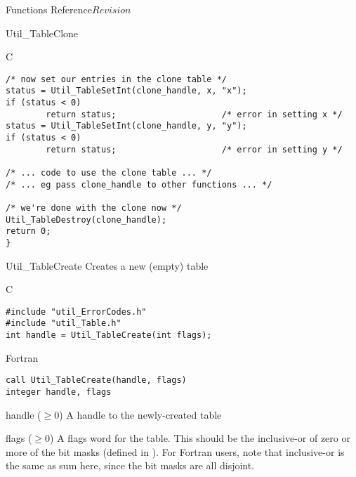\begin{cactuspart}{ Functions Reference}{}{$Revision$}
\begin{FunctionDescription}{Util\_TableClone}
\begin{ExampleSection}
\begin{Example}{C}
\begin{verbatim}
/* now set our entries in the clone table */
status = Util_TableSetInt(clone_handle, x, "x");
if (status < 0)
        return status;                     /* error in setting x */
status = Util_TableSetInt(clone_handle, y, "y");
if (status < 0)
        return status;                     /* error in setting y */

/* ... code to use the clone table ... */
/* ... eg pass clone_handle to other functions ... */

/* we're done with the clone now */
Util_TableDestroy(clone_handle);
return 0;
}
\end{verbatim}
\end{Example}
\end{ExampleSection}
\end{FunctionDescription}


\begin{FunctionDescription}{Util\_TableCreate}
\label{Util-TableCreate}
Creates a new (empty) table

\begin{SynopsisSection}
\begin{Synopsis}{C}
\begin{verbatim}
#include "util_ErrorCodes.h"
#include "util_Table.h"
int handle = Util_TableCreate(int flags);
\end{verbatim}
\end{Synopsis}
\begin{Synopsis}{Fortran}
\begin{verbatim}
call Util_TableCreate(handle, flags)
integer handle, flags
\end{verbatim}
\end{Synopsis}
\end{SynopsisSection}

\begin{ResultSection}
\begin{Result}{handle ($\ge 0$)}
A handle to the newly-created table
\end{Result}
\end{ResultSection}

\begin{ParameterSection}
\begin{Parameter}{flags ($\ge 0$)}
A flags word for the table.  This should be the inclusive-or of zero
or more of the  bit masks (defined in
).  For Fortran users, note that inclusive-or
is the same as sum here, since the bit masks are all disjoint.
\end{Parameter}
\end{ParameterSection}


\end{FunctionDescription}
\end{cactuspart}
